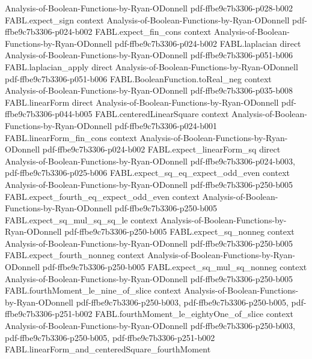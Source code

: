 \begin{theorem}
  {Analysis-of-Boolean-Functions-by-Ryan-ODonnell}
  {pdf-ffbe9c7b3306-p028-b002}
\proofstep
  {FABL.expect_sign}
  {context}
  {Analysis-of-Boolean-Functions-by-Ryan-ODonnell}
  {pdf-ffbe9c7b3306-p024-b002}
\proofstep
  {FABL.expect_fin_cons}
  {context}
  {Analysis-of-Boolean-Functions-by-Ryan-ODonnell}
  {pdf-ffbe9c7b3306-p024-b002}
\proofstep
  {FABL.laplacian}
  {direct}
  {Analysis-of-Boolean-Functions-by-Ryan-ODonnell}
  {pdf-ffbe9c7b3306-p051-b006}
\proofstep
  {FABL.laplacian_apply}
  {direct}
  {Analysis-of-Boolean-Functions-by-Ryan-ODonnell}
  {pdf-ffbe9c7b3306-p051-b006}
\proofstep
  {FABL.BooleanFunction.toReal_neg}
  {context}
  {Analysis-of-Boolean-Functions-by-Ryan-ODonnell}
  {pdf-ffbe9c7b3306-p035-b008}
\proofstep
  {FABL.linearForm}
  {direct}
  {Analysis-of-Boolean-Functions-by-Ryan-ODonnell}
  {pdf-ffbe9c7b3306-p044-b005}
\proofstep
  {FABL.centeredLinearSquare}
  {context}
  {Analysis-of-Boolean-Functions-by-Ryan-ODonnell}
  {pdf-ffbe9c7b3306-p024-b001}
\proofstep
  {FABL.linearForm_fin_cons}
  {context}
  {Analysis-of-Boolean-Functions-by-Ryan-ODonnell}
  {pdf-ffbe9c7b3306-p024-b002}
\proofstep
  {FABL.expect_linearForm_sq}
  {direct}
  {Analysis-of-Boolean-Functions-by-Ryan-ODonnell}
  {pdf-ffbe9c7b3306-p024-b003,
    pdf-ffbe9c7b3306-p025-b006}
\proofstep
  {FABL.expect_sq_eq_expect_odd_even}
  {context}
  {Analysis-of-Boolean-Functions-by-Ryan-ODonnell}
  {pdf-ffbe9c7b3306-p250-b005}
\proofstep
  {FABL.expect_fourth_eq_expect_odd_even}
  {context}
  {Analysis-of-Boolean-Functions-by-Ryan-ODonnell}
  {pdf-ffbe9c7b3306-p250-b005}
\proofstep
  {FABL.expect_sq_mul_sq_sq_le}
  {context}
  {Analysis-of-Boolean-Functions-by-Ryan-ODonnell}
  {pdf-ffbe9c7b3306-p250-b005}
\proofstep
  {FABL.expect_sq_nonneg}
  {context}
  {Analysis-of-Boolean-Functions-by-Ryan-ODonnell}
  {pdf-ffbe9c7b3306-p250-b005}
\proofstep
  {FABL.expect_fourth_nonneg}
  {context}
  {Analysis-of-Boolean-Functions-by-Ryan-ODonnell}
  {pdf-ffbe9c7b3306-p250-b005}
\proofstep
  {FABL.expect_sq_mul_sq_nonneg}
  {context}
  {Analysis-of-Boolean-Functions-by-Ryan-ODonnell}
  {pdf-ffbe9c7b3306-p250-b005}
\proofstep
  {FABL.fourthMoment_le_nine_of_slice}
  {context}
  {Analysis-of-Boolean-Functions-by-Ryan-ODonnell}
  {pdf-ffbe9c7b3306-p250-b003,
    pdf-ffbe9c7b3306-p250-b005,
    pdf-ffbe9c7b3306-p251-b002}
\proofstep
  {FABL.fourthMoment_le_eightyOne_of_slice}
  {context}
  {Analysis-of-Boolean-Functions-by-Ryan-ODonnell}
  {pdf-ffbe9c7b3306-p250-b003,
    pdf-ffbe9c7b3306-p250-b005,
    pdf-ffbe9c7b3306-p251-b002}
\proofstep
  {FABL.linearForm_and_centeredSquare_fourthMoment}

\end{theorem}
